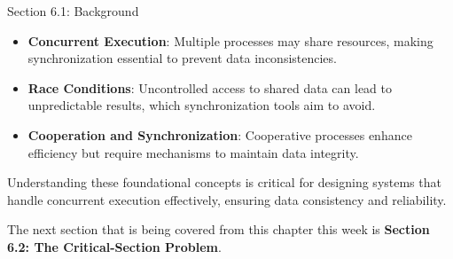 \begin{notes}{Section 6.1: Background}
\begin{highlight}
    \end{highlight}
    
    \begin{highlight}
    
        \begin{itemize}
            \item \textbf{Concurrent Execution}: Multiple processes may share resources, making synchronization essential to prevent data inconsistencies.
            \item \textbf{Race Conditions}: Uncontrolled access to shared data can lead to unpredictable results, which synchronization tools aim to avoid.
            \item \textbf{Cooperation and Synchronization}: Cooperative processes enhance efficiency but require mechanisms to maintain data integrity.
        \end{itemize}
    
    Understanding these foundational concepts is critical for designing systems that handle concurrent execution effectively, ensuring data consistency and reliability.
    
    \end{highlight}
\end{notes}

The next section that is being covered from this chapter this week is \textbf{Section 6.2: The Critical-Section Problem}.

